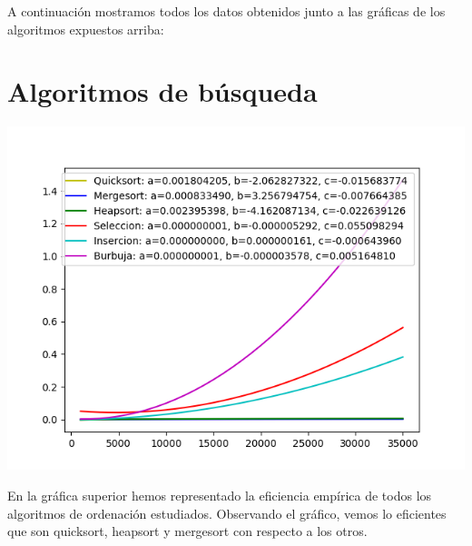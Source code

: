 \documentclass[11pt]{article}
\begin{document}
A continuación mostramos todos los datos obtenidos junto a las gráficas de los algoritmos expuestos arriba:




























\section{Algoritmos de búsqueda}
\begin{center}
\includegraphics[scale=0.6]{../graficos/ordenacion/ordenacion_antonio.png}
\end{center}

En la gráfica superior hemos representado la eficiencia empírica de todos los algoritmos de ordenación estudiados. Observando el gráfico, vemos lo eficientes que son quicksort, heapsort y mergesort con respecto a los otros.
\end{document}
